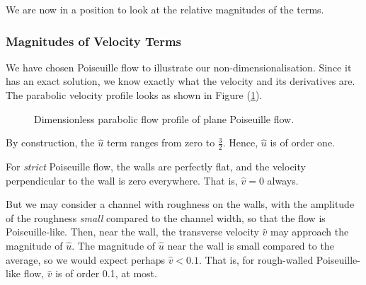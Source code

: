 \documentclass[12pt, a4paper, twoside, openright]{book}
\begin{document}
\vspace{1em}
We are now in a position to look at the relative magnitudes of the terms.

\clearpage
\subsubsection{Magnitudes of Velocity Terms}



We have chosen Poiseuille flow to illustrate our non-dimensionalisation.  Since it has an exact solution, we know exactly what the velocity and its derivatives are.
The parabolic velocity profile looks as shown in Figure (\ref{poise}).

\begin{figure}[ht]
\centering
{}
\caption{Dimensionless parabolic flow profile of plane Poiseuille flow.}\label{poise}
\end{figure}


By construction, the $\hat{u}$ term ranges from zero to $\frac{3}{2}$. Hence, $\hat{u}$ is of order one.

For \emph{strict} Poiseuille flow, the walls are perfectly flat, and the velocity perpendicular to the wall is zero everywhere.  That is, $\hat{v} = 0$ always. 

But we may consider a channel with roughness on the walls, with the amplitude of the roughness \emph{small} compared to the channel width, so that the flow is Poiseuille-like.  Then, near the wall, the transverse velocity $\hat{v}$ may approach the magnitude of $\hat{u}$.  The magnitude of $\hat{u}$ near the wall is small compared to the average, so we would expect perhaps $\hat{v} < 0.1$.  That is, for rough-walled Poiseuille-like flow, $\hat{v}$ is of order 0.1, at most.
\end{document}
